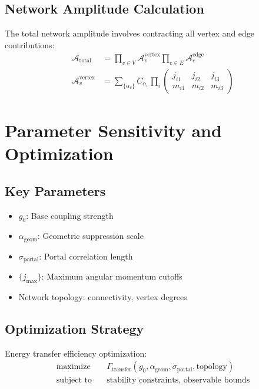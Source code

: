 \documentclass{article}
\begin{document}
\subsection{Network Amplitude Calculation}

The total network amplitude involves contracting all vertex and edge contributions:
\begin{align}
\mathcal{A}_{\text{total}} &= \prod_{v \in V} \mathcal{A}_v^{\text{vertex}} \prod_{e \in E} \mathcal{A}_e^{\text{edge}} \\
\mathcal{A}_v^{\text{vertex}} &= \sum_{\{\alpha_v\}} C_{\alpha_v} \prod_{i} \begin{pmatrix} j_{i1} & j_{i2} & j_{i3} \\ m_{i1} & m_{i2} & m_{i3} \end{pmatrix}
\end{align}

\section{Parameter Sensitivity and Optimization}

\subsection{Key Parameters}

\begin{itemize}
\item $g_0$: Base coupling strength
\item $\alpha_{\text{geom}}$: Geometric suppression scale
\item $\sigma_{\text{portal}}$: Portal correlation length
\item $\{j_{\max}\}$: Maximum angular momentum cutoffs
\item Network topology: connectivity, vertex degrees
\end{itemize}

\subsection{Optimization Strategy}

Energy transfer efficiency optimization:
\begin{align}
\text{maximize} \quad &\Gamma_{\text{transfer}}(g_0, \alpha_{\text{geom}}, \sigma_{\text{portal}}, \text{topology}) \\
\text{subject to} \quad &\text{stability constraints, observable bounds}
\end{align}
\end{document}
